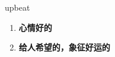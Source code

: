 
\begin{frame}
{\huge upbeat}
\begin{center}
\begin{enumerate}\Large
  \item \textbf{心情好的}
  \item \textbf{给人希望的，象征好运的}
\end{enumerate}
\end{center}
\end{frame}
